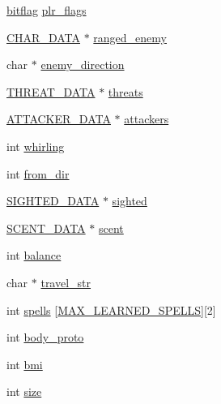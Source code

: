 \begin{DoxyCompactItemize}
\item 
\hyperlink{structs_8h_af5b34f10bae6d3b8f168d5eb6fab2925}{bitflag} \hyperlink{structchar__data_a5f3a85a5267b96c382930de7eb15d8a5}{plr\-\_\-flags}
\item 
\hyperlink{structs_8h_af33ed1e66e8541a08bed257124f50f31}{C\-H\-A\-R\-\_\-\-D\-A\-T\-A} $\ast$ \hyperlink{structchar__data_a56d8c701dc162c5a5d9f9588601cb79f}{ranged\-\_\-enemy}
\item 
char $\ast$ \hyperlink{structchar__data_a856ba0e787b1b2f4e31133729ced7f0b}{enemy\-\_\-direction}
\item 
\hyperlink{structs_8h_aed0fe51c5cd01a7f8f46bdc898586ad8}{T\-H\-R\-E\-A\-T\-\_\-\-D\-A\-T\-A} $\ast$ \hyperlink{structchar__data_a0841def53b45eb0635075b57aa37b95d}{threats}
\item 
\hyperlink{structs_8h_a72de0d7a32d309e37b0abace8b26b98c}{A\-T\-T\-A\-C\-K\-E\-R\-\_\-\-D\-A\-T\-A} $\ast$ \hyperlink{structchar__data_a7d237737d6923afacc942d4b753a7902}{attackers}
\item 
int \hyperlink{structchar__data_a0463aadabddfde6ba5f77a29af7f96b3}{whirling}
\item 
int \hyperlink{structchar__data_a01dd4395da357ea7f8643bd3c89176b9}{from\-\_\-dir}
\item 
\hyperlink{structs_8h_ae81f55dce9668a8e25cb7d6b3c2d6cce}{S\-I\-G\-H\-T\-E\-D\-\_\-\-D\-A\-T\-A} $\ast$ \hyperlink{structchar__data_a2486721d1cc32c0f123a2c810d4b75ae}{sighted}
\item 
\hyperlink{structs_8h_a65372345a26d15a29af1abf6cb29f785}{S\-C\-E\-N\-T\-\_\-\-D\-A\-T\-A} $\ast$ \hyperlink{structchar__data_a80055dbb0053f7733dbe26625f8f1c53}{scent}
\item 
int \hyperlink{structchar__data_a0e23aec4bb8d74d92c28d32bc65f3439}{balance}
\item 
char $\ast$ \hyperlink{structchar__data_a40c95c367e862d84c88d242a6e128c24}{travel\-\_\-str}
\item 
int \hyperlink{structchar__data_ac09a999c27b701b68ce0cf5184280628}{spells} \mbox{[}\hyperlink{structs_8h_af17694401553abe26208139cb9d1e3b2}{M\-A\-X\-\_\-\-L\-E\-A\-R\-N\-E\-D\-\_\-\-S\-P\-E\-L\-L\-S}\mbox{]}\mbox{[}2\mbox{]}
\item 
int \hyperlink{structchar__data_a91946f6b566493c49968190802f79162}{body\-\_\-proto}
\item 
int \hyperlink{structchar__data_a49ce01da752873bcefece2fdfff29ca8}{bmi}
\item 
int \hyperlink{structchar__data_a699b64dc10cf344d241d51c6a8c91d2f}{size}
\item 

\end{DoxyCompactItemize}
